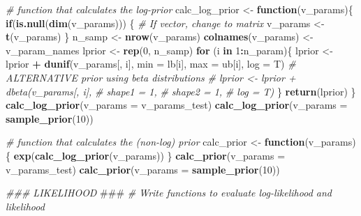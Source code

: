 \documentclass[
]{article}
\newenvironment{Shaded}{\begin{snugshade}}{\end{snugshade}}
\newcommand{\AlertTok}[1]{\textcolor[rgb]{0.94,0.16,0.16}{#1}}
\newcommand{\CommentTok}[1]{\textcolor[rgb]{0.56,0.35,0.01}{\textit{#1}}}
\newcommand{\ControlFlowTok}[1]{\textcolor[rgb]{0.13,0.29,0.53}{\textbf{#1}}}
\newcommand{\DataTypeTok}[1]{\textcolor[rgb]{0.13,0.29,0.53}{#1}}
\newcommand{\DecValTok}[1]{\textcolor[rgb]{0.00,0.00,0.81}{#1}}
\newcommand{\KeywordTok}[1]{\textcolor[rgb]{0.13,0.29,0.53}{\textbf{#1}}}
\newcommand{\NormalTok}[1]{#1}
\newcommand{\OperatorTok}[1]{\textcolor[rgb]{0.81,0.36,0.00}{\textbf{#1}}}
\newcommand{\StringTok}[1]{\textcolor[rgb]{0.31,0.60,0.02}{#1}}
\begin{document}
\begin{Shaded}
\begin{Highlighting}[]
\CommentTok{# function that calculates the log-prior}
\NormalTok{calc_log_prior <-}\StringTok{ }\ControlFlowTok{function}\NormalTok{(v_params)\{}
  \ControlFlowTok{if}\NormalTok{(}\KeywordTok{is.null}\NormalTok{(}\KeywordTok{dim}\NormalTok{(v_params))) \{ }\CommentTok{# If vector, change to matrix}
\NormalTok{    v_params <-}\StringTok{ }\KeywordTok{t}\NormalTok{(v_params) }
\NormalTok{  \}}
\NormalTok{  n_samp <-}\StringTok{ }\KeywordTok{nrow}\NormalTok{(v_params)}
  \KeywordTok{colnames}\NormalTok{(v_params) <-}\StringTok{ }\NormalTok{v_param_names}
\NormalTok{  lprior <-}\StringTok{ }\KeywordTok{rep}\NormalTok{(}\DecValTok{0}\NormalTok{, n_samp)}
  \ControlFlowTok{for}\NormalTok{ (i }\ControlFlowTok{in} \DecValTok{1}\OperatorTok{:}\NormalTok{n_param)\{}
\NormalTok{    lprior <-}\StringTok{ }\NormalTok{lprior }\OperatorTok{+}\StringTok{ }\KeywordTok{dunif}\NormalTok{(v_params[, i],}
                             \DataTypeTok{min =}\NormalTok{ lb[i],}
                             \DataTypeTok{max =}\NormalTok{ ub[i], }
                             \DataTypeTok{log =}\NormalTok{ T)}
    \CommentTok{# ALTERNATIVE prior using beta distributions}
    \CommentTok{# lprior <- lprior + dbeta(v_params[, i],}
    \CommentTok{#                          shape1 = 1,}
    \CommentTok{#                          shape2 = 1, }
    \CommentTok{#                          log = T)}
\NormalTok{  \}}
  \KeywordTok{return}\NormalTok{(lprior)}
\NormalTok{\}}
\KeywordTok{calc_log_prior}\NormalTok{(}\DataTypeTok{v_params =}\NormalTok{ v_params_test)}
\KeywordTok{calc_log_prior}\NormalTok{(}\DataTypeTok{v_params =} \KeywordTok{sample_prior}\NormalTok{(}\DecValTok{10}\NormalTok{))}


\CommentTok{# function that calculates the (non-log) prior}
\NormalTok{calc_prior <-}\StringTok{ }\ControlFlowTok{function}\NormalTok{(v_params) \{ }
  \KeywordTok{exp}\NormalTok{(}\KeywordTok{calc_log_prior}\NormalTok{(v_params)) }
\NormalTok{\}}
\KeywordTok{calc_prior}\NormalTok{(}\DataTypeTok{v_params =}\NormalTok{ v_params_test)}
\KeywordTok{calc_prior}\NormalTok{(}\DataTypeTok{v_params =} \KeywordTok{sample_prior}\NormalTok{(}\DecValTok{10}\NormalTok{))}


\CommentTok{###  LIKELIHOOD  }\AlertTok{###}
\CommentTok{# Write functions to evaluate log-likelihood and likelihood}


\end{Highlighting}
\end{Shaded}
\end{document}

